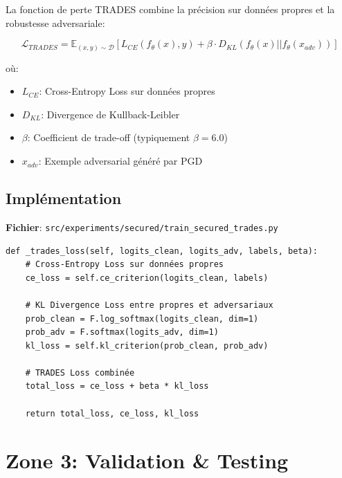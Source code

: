 \documentclass[11pt,a4paper]{article}
\begin{document}
\begin{tcolorbox}[colback=blue!5, colframe=blue!50!black, title=\textbf{TRADES Loss Function}]
La fonction de perte TRADES combine la précision sur données propres et la robustesse adversariale:

\begin{equation}
\mathcal{L}_{TRADES} = \mathbb{E}_{(x,y)\sim\mathcal{D}} \left[ L_{CE}(f_\theta(x), y) + \beta \cdot D_{KL}(f_\theta(x) || f_\theta(x_{adv})) \right]
\end{equation}

où:
\begin{itemize}
    \item $L_{CE}$: Cross-Entropy Loss sur données propres
    \item $D_{KL}$: Divergence de Kullback-Leibler
    \item $\beta$: Coefficient de trade-off (typiquement $\beta = 6.0$)
    \item $x_{adv}$: Exemple adversarial généré par PGD
\end{itemize}
\end{tcolorbox}

\subsection{Implémentation}

\textbf{Fichier}: \texttt{src/experiments/secured/train\_secured\_trades.py}

\begin{tcolorbox}[colback=gray!5, colframe=gray!50, title=Extrait de code - TRADES Training]
\begin{verbatim}
def _trades_loss(self, logits_clean, logits_adv, labels, beta):
    # Cross-Entropy Loss sur données propres
    ce_loss = self.ce_criterion(logits_clean, labels)

    # KL Divergence Loss entre propres et adversariaux
    prob_clean = F.log_softmax(logits_clean, dim=1)
    prob_adv = F.softmax(logits_adv, dim=1)
    kl_loss = self.kl_criterion(prob_clean, prob_adv)

    # TRADES Loss combinée
    total_loss = ce_loss + beta * kl_loss

    return total_loss, ce_loss, kl_loss
\end{verbatim}
\end{tcolorbox}

\newpage

\section{Zone 3: Validation \& Testing}
\end{document}
